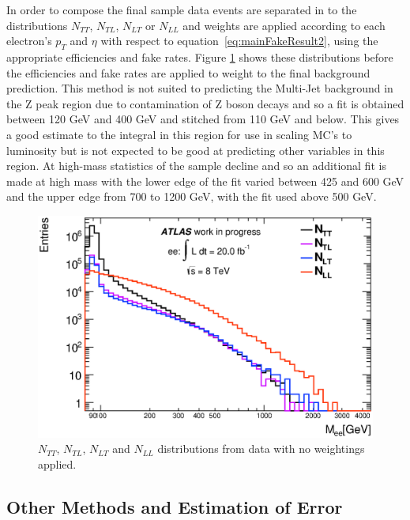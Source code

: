 In order to compose the final sample data events are separated in to the distributions $N_{TT}$, $N_{TL}$, $N_{LT}$ or $N_{LL}$ and weights are applied according to each electron's $p_{T}$ and $\eta$ with respect to equation~\ref{eq:mainFakeResult2}, using the appropriate efficiencies and fake rates. 
Figure \ref{fig:N_dist} shows these distributions before the efficiencies and fake rates are applied to weight to the final background prediction. This method is not suited to predicting the Multi-Jet background in the Z peak region due to contamination of Z boson decays and so a fit is obtained between 120 GeV and 400 GeV and stitched from 110 GeV and below. This gives a good estimate to the integral in this region for use in scaling MC's to luminosity but is not expected to be good at predicting other variables in this region. At high-mass statistics of the sample decline and so an additional fit is made at high mass with the lower edge of the fit varied between 425 and 600 GeV and the upper edge from 700 to 1200 GeV, with the fit used above 500 GeV.

   \begin{figure}[h]
      \begin{center}
      \includegraphics[width=0.98\linewidth]{images/N_distributions.eps}
      \end{center}
   \caption{$N_{TT}$, $N_{TL}$, $N_{LT}$ and $N_{LL}$ distributions from data with no weightings applied.}
   \label{fig:N_dist}
   \end{figure}






\subsection{Other Methods and Estimation of Error}
   \label{sec:MJerror}


